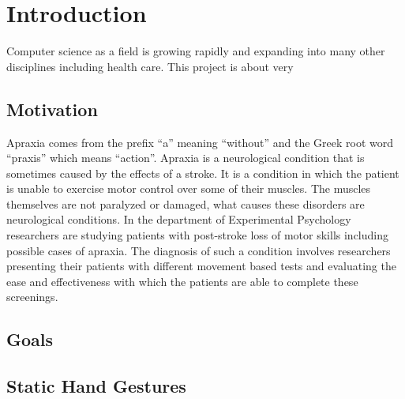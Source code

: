 \chapter{Introduction}

\label{Chapter1_introduction} 

\begin{comment}
-------------------------------------------------
1. Introduction
	a. Motivation
	b. Goals 
	c. Static Hand Gestures 
-------------------------------------------------
\end{comment}
Computer science as a field is growing rapidly and expanding into many other disciplines including health care. This project is about very 


\section{Motivation}
Apraxia comes from the prefix “a” meaning “without” and the  Greek root word “praxis” which means “action”. Apraxia is a neurological condition that is sometimes caused by the effects of a stroke. It is a condition in which the patient is unable to exercise motor control over some of their muscles. The muscles themselves are not paralyzed or damaged, what causes these disorders are neurological conditions. In the department of Experimental Psychology researchers are studying patients with post-stroke loss of motor skills including possible cases of apraxia. The diagnosis of such a condition involves researchers presenting their patients with different movement based tests and evaluating the ease and effectiveness with which the patients are able to complete these screenings.  
	
\section{Goals}


\section{Static Hand Gestures}

